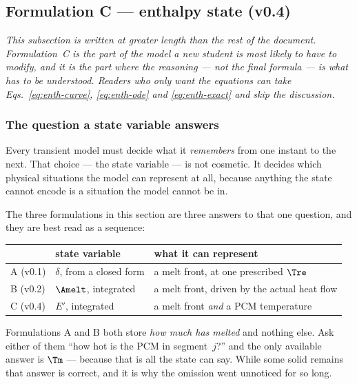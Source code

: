 \subsection{Formulation C --- enthalpy state (v0.4)}
\label{sec:front:enthalpy}

\emph{This subsection is written at greater length than the rest of the
document. Formulation~C is the part of the model a new student is most likely to
have to modify, and it is the part where the reasoning --- not the final
formula --- is what has to be understood. Readers who only want the equations
can take Eqs.~\eqref{eq:enth-curve}, \eqref{eq:enth-ode} and
\eqref{eq:enth-exact} and skip the discussion.}

\subsubsection{The question a state variable answers}

Every transient model must decide what it \emph{remembers} from one instant to
the next. That choice --- the state variable --- is not cosmetic. It decides
which physical situations the model can represent at all, because anything the
state cannot encode is a situation the model cannot be in.

The three formulations in this section are three answers to that one question,
and they are best read as a sequence:

\begin{center}
\begin{tabular}{@{}l l l@{}}
\toprule
 & state variable & what it can represent \\
\midrule
A (v0.1) & $\delta$, from a closed form & a melt front, at one prescribed $\Tre$ \\
B (v0.2) & $\Amelt$, integrated & a melt front, driven by the actual heat flow \\
C (v0.4) & $E'$, integrated & a melt front \emph{and} a PCM temperature \\
\bottomrule
\end{tabular}
\end{center}

\noindent
Formulations A and B both store \emph{how much has melted} and nothing else.
Ask either of them ``how hot is the PCM in segment~$j$?'' and the only available
answer is $\Tm$ --- because that is all the state can say. While some solid
remains that answer is correct, and it is why the omission went unnoticed for so
long.

